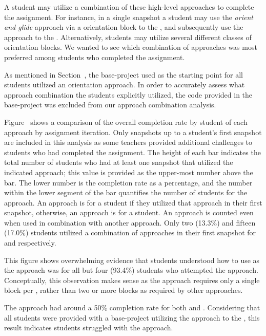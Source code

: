 A student may utilize a combination of these high-level approaches to complete
the assignment. For instance, in a single snapshot a student may use the
\emph{orient and glide} approach via a \rel{} orientation block to \catch{} the
\bear{}, and subsequently use the \glideto{} approach to \catch{} the
\horse{}. Alternatively, students may utilize several different classes of
orientation blocks. We wanted to see which combination of approaches was most
preferred among students who completed the assignment.

As mentioned in Section~, the base-project used as the
starting point for all students utilized an \abs{} orientation approach. In
order to accurately assess what approach combination the students explicitly
utilized, the code provided in the base-project was excluded from our approach
combination analysis.

Figure~ shows a comparison of the
overall completion rate by student of each approach by assignment
iteration. Only snapshots up to a student's first \com{} snapshot are included
in this analysis as some teachers provided additional challenges to students
who had completed the assignment. The height of each bar indicates the total
number of students who had at least one snapshot that utilized the indicated
approach; this value is provided as the upper-most number above the bar. The
lower number is the completion rate as a percentage, and the number within the
lower segment of the bar quantifies the number of \com{} students for the
approach. An approach is \com{} for a student if they utilized that approach in
their first \com{} snapshot, otherwise, an approach is \incom{} for a
student. An approach is counted even when used in combination with another
approach. Only two (13.3\%) and fifteen (17.0\%) \com{} students utilized a
combination of approaches in their first \com{} snapshot for \sone{} and
\stwo{} respectively.

This figure shows overwhelming evidence that students understood how to use
\glideto{} as the approach was \com{} for all but four (93.4\%) students who
attempted the approach. Conceptually, this observation makes sense as the
approach requires only a single block per \catch{}, rather than two or more
blocks as required by other approaches.

The \abs{} approach had around a 50\% completion rate for both \sone{} and
\stwo{}. Considering that all students were provided with a base-project
utilizing the \abs{} approach to \catch{} the \zebra{}, this result indicates
students struggled with the \abs{} approach.

